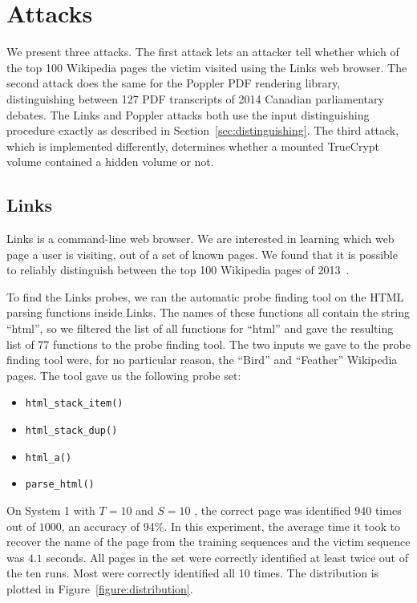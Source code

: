 \documentclass[letterpaper,twocolumn,10pt]{article}
\begin{document}
\section{Attacks}
\label{sec:results}

We present three attacks. The first attack lets an attacker tell whether which
of the top 100 Wikipedia pages the victim visited using the Links web browser.
The second attack does the same for the Poppler PDF rendering library,
distinguishing between 127 PDF transcripts of 2014 Canadian parliamentary
debates. The Links and Poppler attacks both use the input distinguishing
procedure exactly as described in Section~\ref{sec:distinguishing}. The third
attack, which is implemented differently, determines whether a mounted TrueCrypt
volume contained a hidden volume or not.

\subsection{Links}

Links is a command-line web browser. We are interested in learning which web
page a user is visiting, out of a set of known pages. We found that it is
possible to reliably distinguish between the top 100 Wikipedia pages of
2013~\cite{wikitop2013}.

To find the Links probes, we ran the automatic probe finding tool on the HTML
parsing functions inside Links. The names of these functions all contain the
string ``html'', so we filtered the list of all functions for ``html'' and gave
the resulting list of 77 functions to the probe finding tool. The two inputs we
gave to the probe finding tool were, for no particular reason, the ``Bird'' and
``Feather'' Wikipedia pages. The tool gave us the following probe set:

\begin{itemize}
    \item \texttt{html\_stack\_item()}
    \item \texttt{html\_stack\_dup()}
    \item \texttt{html\_a()}
    \item \texttt{parse\_html()}
\end{itemize}

On System 1 with $T=10$ and $S=10$ , the correct page was
identified $940$ times out of $1000$, an accuracy of 94\%. In this experiment,
the average time it took to recover the name of the page from the training
sequences and the victim sequence was $4.1$ seconds. All pages in the set were
correctly identified at least twice out of the ten runs. Most were correctly
identified all 10 times. The distribution is plotted in
Figure~\ref{figure:distribution}.
\end{document}
